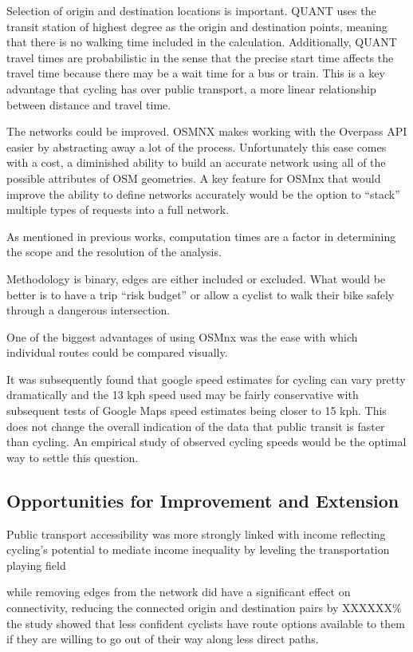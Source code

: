 Selection of origin and destination locations is important. QUANT uses the transit station of highest degree as the origin and destination points, meaning that there is no walking time included in the calculation. Additionally, QUANT travel times are probabilistic in the sense that the precise start time affects the travel time because there may be a wait time for a bus or train. This is a key advantage that cycling has over public transport, a more linear relationship between distance and travel time. 

The networks could be improved. OSMNX makes working with the Overpass API easier by abstracting away a lot of the process. Unfortunately this ease comes with a cost, a diminished ability to build an accurate network using all of the possible attributes of OSM geometries. A key feature for OSMnx that would improve the ability to define networks accurately would be the option to ``stack'' multiple types of requests into a full network.  

As mentioned in previous works, computation times are a factor in determining the scope and the resolution of the analysis. 

Methodology is binary, edges are either included or excluded. What would be better is to have a trip ``risk budget''  or allow a cyclist to walk their bike safely through a dangerous intersection. 

One of the biggest advantages of using OSMnx was the ease with which individual routes could be compared visually. 

It was subsequently found that google speed estimates for cycling can vary pretty dramatically and the 13 kph speed used may be fairly conservative with subsequent tests of Google Maps speed estimates being closer to 15 kph. This does not change the overall indication of the data that public transit is faster than cycling. An empirical study of observed cycling speeds would be the optimal way to settle this question. 

\subsection{Opportunities for Improvement and Extension}

Public transport accessibility was more strongly linked with income reflecting cycling's potential to mediate income inequality by leveling the transportation playing field

while removing edges from the network did have a significant effect on connectivity, reducing the connected origin and destination pairs by XXXXXX\% the study showed that less confident cyclists have route options available to them if they are willing to go out of their way along less direct paths. 


